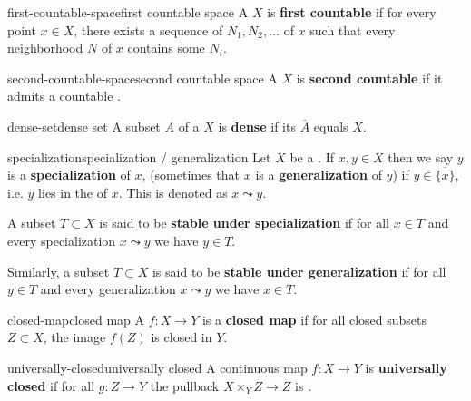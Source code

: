 \begin{topic}{first-countable-space}{first countable space}
    A  $X$ is \textbf{first countable} if for every point $x \in X$, there exists a sequence of  $N_1, N_2, \ldots$ of $x$ such that every neighborhood $N$ of $x$ contains some $N_i$.
\end{topic}

\begin{topic}{second-countable-space}{second countable space}
    A  $X$ is \textbf{second countable} if it admits a countable .
\end{topic}

\begin{topic}{dense-set}{dense set}
    A subset $A$ of a  $X$ is \textbf{dense} if its  $\overline{A}$ equals $X$.
\end{topic}

\begin{topic}{specialization}{specialization / generalization}
    Let $X$ be a . If $x, y \in X$ then we say $y$ is a \textbf{specialization} of $x$, (sometimes that $x$ is a \textbf{generalization} of $y$) if $y \in \overline{\{ x \}}$, i.e. $y$ lies in the  of $x$. This is denoted as $x \leadsto y$.
    
    A subset $T \subset X$ is said to be \textbf{stable under specialization} if for all $x \in T$ and every specialization $x \leadsto y$ we have $y \in T$.
    
    Similarly, a subset $T \subset X$ is said to be \textbf{stable under generalization} if for all $y \in T$ and every generalization $x \leadsto y$ we have $x \in T$.
\end{topic}

\begin{topic}{closed-map}{closed map}
    A  $f \colon X \to Y$ is a \textbf{closed map} if for all closed subsets $Z \subset X$, the image $f(Z)$ is closed in $Y$.
\end{topic}

\begin{topic}{universally-closed}{universally closed}
    A continuous map $f \colon X \to Y$ is \textbf{universally closed} if for all $g \colon Z \to Y$ the pullback $X \times_Y Z \to Z$ is .
\end{topic}

